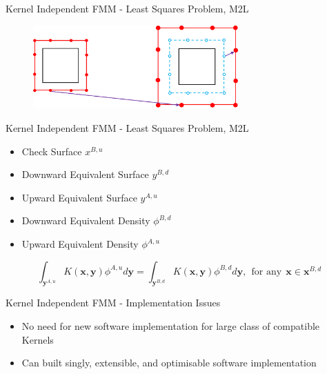 \begin{frame}{Kernel Independent FMM - Least Squares Problem, M2L}

    \begin{figure}
        \centering
        \includegraphics[width=0.7\textwidth]{assets/kifmm_m2l.png}
        \vspace{50pt}
    \end{figure}
\end{frame}

\begin{frame}{Kernel Independent FMM - Least Squares Problem, M2L}
    \begin{itemize}
        \item Check Surface $x^{B, u}$
        \item Downward Equivalent Surface $y^{B, d}$
        \item Upward Equivalent Surface $y^{A, u}$
        \item Downward Equivalent Density $\phi^{B, d}$
        \item Upward Equivalent Density $\phi^{A, u}$
    \end{itemize}

    \begin{equation}
        \int_{\mathbf{y}^{A,u}} K(\mathbf{x}, \mathbf{y})\phi^{A, u} d\mathbf{y} =   \int_{\mathbf{y}^{B,d}} K(\mathbf{x}, \mathbf{y})\phi^{B, d} d\mathbf{y}, \> \> \text{for any} \> \> \mathbf{x} \in \mathbf{x}^{B, d}
    \end{equation}
\end{frame}

\begin{frame}{Kernel Independent FMM - Implementation Issues}
    \begin{itemize}
        \item No need for new software implementation for large class of compatible Kernels
        \item Can built singly, extensible, and optimisable software implementation
    \end{itemize}
\end{frame}